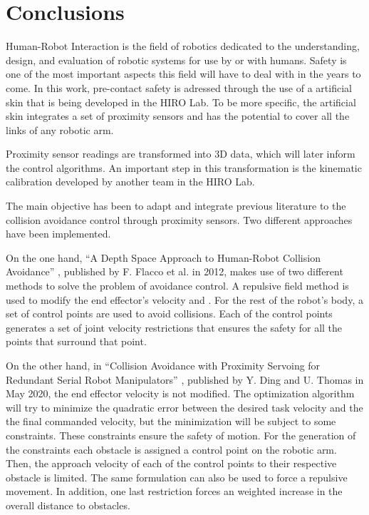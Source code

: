 \chapter{Conclusions}
\label{conclusionschap}

Human-Robot Interaction is the field of robotics dedicated to the understanding, design, and evaluation of robotic systems for use by or with humans. Safety is one of the most important aspects this field will have to deal with in the years to come. In this work, pre-contact safety is adressed through the use of a artificial skin that is being developed in the HIRO Lab. To be more specific, the artificial skin integrates a set of proximity sensors and has the potential to cover all the links of any robotic arm.

Proximity sensor readings are transformed into 3D data, which will later inform the control algorithms. An important step in this transformation is the kinematic calibration developed by another team in the HIRO Lab.

The main objective has been to adapt and integrate previous literature to the collision avoidance control through proximity sensors. Two different approaches have been implemented.

On the one hand, ``A Depth Space Approach to Human-Robot Collision Avoidance'' \cite{flacco2012depth}, published by F. Flacco et al. in 2012, makes use of two different methods to solve the problem of avoidance control. A repulsive field method is used to modify the end effector's velocity and . For the rest of the robot's body, a set of control points are used to avoid collisions. Each of the control points generates a set of joint velocity restrictions that ensures the safety for all the points that surround that point.

On the other hand, in ``Collision Avoidance with Proximity Servoing for Redundant Serial Robot Manipulators'' \cite{dingcollision}, published by Y. Ding and U. Thomas in May 2020, the end effector velocity is not modified. The optimization algorithm will try to minimize the quadratic error between the desired task velocity and the the final commanded velocity, but the minimization will be subject to some constraints. These constraints ensure the safety of motion. For the generation of the constraints each obstacle is assigned a control point on the robotic arm. Then, the approach velocity of each of the control points to their respective obstacle is limited. The same formulation can also be used to force a repulsive movement. In addition, one last restriction forces an weighted increase in the overall distance to obstacles.

